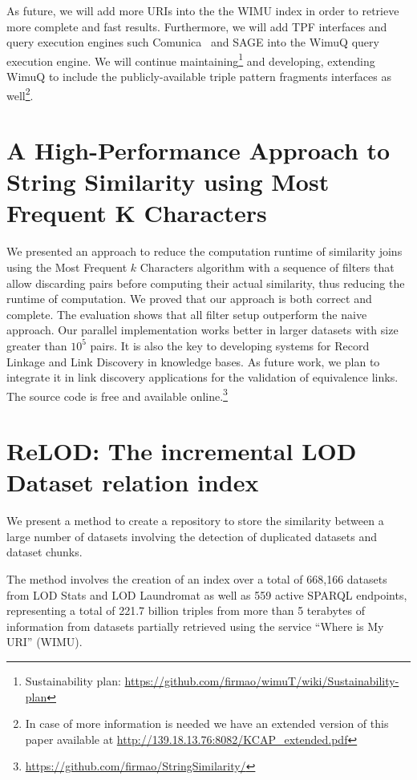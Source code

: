 As future, we will add more URIs into the the WIMU index in order to retrieve more complete and fast results. Furthermore, we will add TPF interfaces and query execution engines such Comunica~\cite{taelman2018comunica} and SAGE \cite{DBLP:journals/corr/abs-1806-00227} into the WimuQ query execution engine. We will continue maintaining\footnote{Sustainability plan: \url{https://github.com/firmao/wimuT/wiki/Sustainability-plan}} and developing, extending WimuQ to include the publicly-available triple pattern fragments interfaces as well\footnote{\label{note1}In case of more information is needed we have an extended version of this paper available at \url{http://139.18.13.76:8082/KCAP_extended.pdf}}.

\section{A High-Performance Approach to String Similarity using Most Frequent K Characters}
We presented an approach to reduce the computation runtime of similarity joins using the Most Frequent $k$ Characters algorithm with a sequence of filters that allow discarding pairs before computing their actual similarity, thus reducing the runtime of computation.
We proved that our approach is both correct and complete. 
The evaluation shows that all filter setup outperform the naive approach. Our parallel implementation works better in larger datasets with size greater than $10^5$ pairs.
It is also the key to developing systems for Record Linkage and Link Discovery in knowledge bases.
As future work, we plan to integrate it in link discovery applications for the validation of equivalence links. The source code is free and available online.\footnote{\url{https://github.com/firmao/StringSimilarity/}}

\section{ReLOD: The incremental LOD Dataset relation index}
We present a method to create a repository to store the similarity between a large number of datasets involving the detection of duplicated datasets and dataset chunks.

The method involves the creation of an index over a total of 668,166 datasets from LOD Stats and LOD Laundromat as well as 559 active SPARQL endpoints, representing a total of 221.7 billion triples from more than 5 terabytes of information from datasets partially retrieved using the service ``Where is My URI'' (WIMU). 

